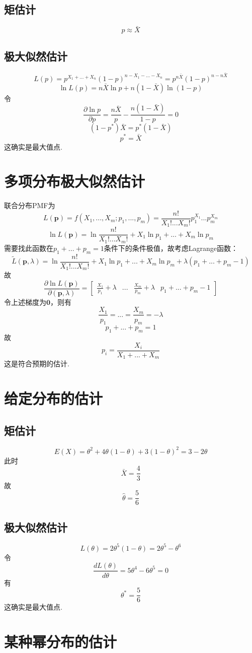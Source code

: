 \documentclass{article}
\begin{document}
\begin{CJK}{UTF8}{gbsn}
\subsection{矩估计}
$$ p\approx \bar{X}$$
\subsection{极大似然估计}
$$ L(p)=p^{X_{1}+...+X_{n}}(1-p)^{n-X_{1}-...-X_{n}}=p^{n\bar{X}}(1-p)^{n-n\bar{X}}$$
$$ \ln L(p)=n\bar{X}\ln p+n(1-\bar{X})\ln(1-p)$$
令
$$ \frac{\partial\ln p}{\partial p}=\frac{n\bar{X}}{p}-\frac{n(1-\bar{X})}{1-p}=0$$
$$(1-p^{*})\bar{X}=p^{*}(1-\bar{X})$$
$$p^{*}=\bar{X}$$
这确实是最大值点.
\section{多项分布极大似然估计}
联合分布PMF为
$$ L(\mathbf{p})=f(X_{1},...,X_{m};p_{1},...,p_{m})=\frac{n!}{X_{1}!...X_{m}!}p_{1}^{X_{1}}...p_{m}^{X_{m}}$$
$$ \ln L(\mathbf{p})=\ln\frac{n!}{X_{1}!...X_{m}!}+X_{1}\ln p_{1}+...+X_{m}\ln p_{m}$$
需要找此函数在$p_{1}+...+p_{m}=1$条件下的条件极值，故考虑Lagrange函数：
$$ \tilde{L}(\mathbf{p},\lambda)=\ln\frac{n!}{X_{1}!...X_{m}!}+X_{1}\ln p_{1}+...+X_{m}\ln p_{m}+\lambda(p_{1}+...+p_{m}-1)$$
故
$$ \frac{\partial{\ln L(\mathbf{p})}}{\partial(\mathbf{p},\lambda)}=\begin{bmatrix}
    \frac{X_{1}}{p_{1}}+\lambda & ... & \frac{X_{m}}{p_{m}}+\lambda & p_{1}+...+p_{m}-1\end{bmatrix}$$
令上述梯度为$\mathbf{0}$，则有
$$ \frac{X_{1}}{p_{1}}=...=\frac{X_{m}}{p_{m}}=-\lambda$$
$$ p_{1}+...+p_{m}=1$$
故
$$ p_{i}=\frac{X_{i}}{X_{1}+...+X_{m}}$$
这是符合预期的估计.
\section{给定分布的估计}
\subsection{矩估计}
$$ E(X)=\theta^{2}+4\theta(1-\theta)+3(1-\theta)^{2}=3-2\theta$$
此时
$$ \bar{X}=\frac{4}{3}$$
故
$$ \hat{\theta}=\frac{5}{6}$$
\subsection{极大似然估计}
$$ L(\theta)=2\theta^{5}(1-\theta)=2\theta^{5}-\theta^{6}$$
令
$$ \frac{dL(\theta)}{d\theta}=5\theta^{4}-6\theta^{5}=0$$
有
$$ \theta^{*}=\frac{5}{6}$$
这确实是最大值点.
\section{某种幂分布的估计}

\end{CJK}
\end{document}
